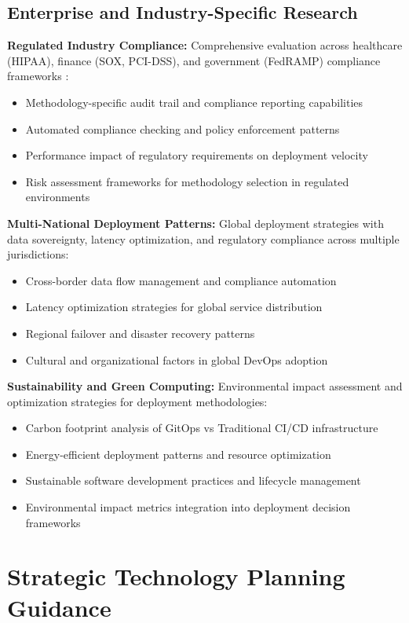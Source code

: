 \subsection{Enterprise and Industry-Specific Research}
\label{subsec:enterprise_research}

\textbf{Regulated Industry Compliance:} Comprehensive evaluation across healthcare (HIPAA), finance (SOX, PCI-DSS), and government (FedRAMP) compliance frameworks \cite{compliance_frameworks}:
\begin{itemize}
\item Methodology-specific audit trail and compliance reporting capabilities
\item Automated compliance checking and policy enforcement patterns
\item Performance impact of regulatory requirements on deployment velocity
\item Risk assessment frameworks for methodology selection in regulated environments
\end{itemize}

\textbf{Multi-National Deployment Patterns:} Global deployment strategies with data sovereignty, latency optimization, and regulatory compliance across multiple jurisdictions:
\begin{itemize}
\item Cross-border data flow management and compliance automation
\item Latency optimization strategies for global service distribution
\item Regional failover and disaster recovery patterns
\item Cultural and organizational factors in global DevOps adoption
\end{itemize}

\textbf{Sustainability and Green Computing:} Environmental impact assessment and optimization strategies for deployment methodologies:
\begin{itemize}
\item Carbon footprint analysis of GitOps vs Traditional CI/CD infrastructure
\item Energy-efficient deployment patterns and resource optimization
\item Sustainable software development practices and lifecycle management
\item Environmental impact metrics integration into deployment decision frameworks
\end{itemize}

\section{Strategic Technology Planning Guidance}
\label{sec:strategic_guidance}

